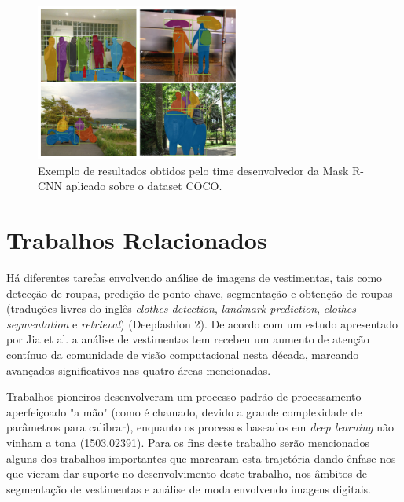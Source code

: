 \documentclass[12pt]{report}
\begin{document}
\begin{figure}
    \centering
    \includegraphics[width=0.6\textwidth]{images/mask.png}
    \caption{Exemplo de resultados obtidos pelo time desenvolvedor da Mask R-CNN aplicado sobre o dataset COCO.}
    \label{fig:mask}
\end{figure}


\chapter{Trabalhos Relacionados}
\label{cha:relacionados}

Há diferentes tarefas envolvendo análise de imagens de vestimentas, tais como detecção de roupas, predição de ponto chave, segmentação e obtenção de roupas (traduções livres do inglês \textit{clothes detection}, \textit{landmark prediction}, \textit{clothes segmentation} e \textit{retrieval}) (Deepfashion 2). De acordo com um estudo apresentado por Jia et al. a análise de vestimentas tem recebeu um aumento de atenção contínuo da comunidade de visão computacional nesta década, marcando avançados significativos nas quatro áreas mencionadas.



Trabalhos pioneiros desenvolveram um processo padrão de processamento aperfeiçoado "a mão" (como é chamado, devido a grande complexidade de parâmetros para calibrar), enquanto os processos baseados em \textit{deep learning} não vinham a tona (1503.02391). Para os fins deste trabalho serão mencionados alguns dos trabalhos importantes que marcaram esta trajetória dando ênfase nos que vieram dar suporte no desenvolvimento deste trabalho, nos âmbitos de segmentação de vestimentas e análise de moda envolvendo imagens digitais. 
\end{document}
